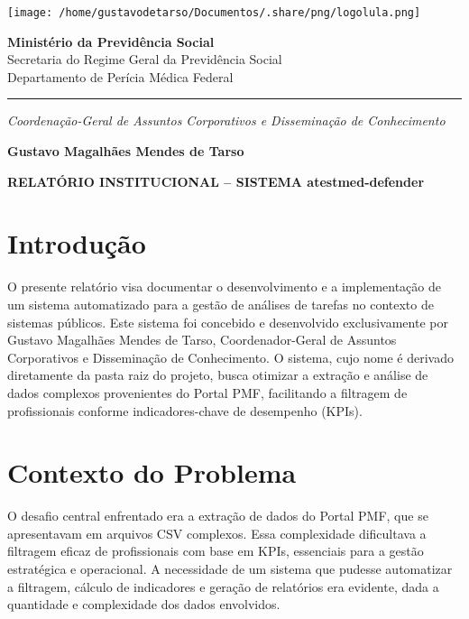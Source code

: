\documentclass[11pt]{article}
\author{Gustavo M. Mendes de Tarso}
\date{\today}
\title{}
\begin{document}
\begin{center}
\texttt{[image: /home/gustavodetarso/Documentos/.share/png/logolula.png]}
\end{center}

\vspace{-1.8cm}
\begin{center}
\textbf{Ministério da Previdência Social}\\
Secretaria do Regime Geral da Previdência Social\\
Departamento de Perícia Médica Federal
\end{center}

\vspace{-0.3cm}
\hrule

\vspace{-0.3cm}
\begin{center}
\textit{Coordenação-Geral de Assuntos Corporativos e Disseminação de Conhecimento}
\end{center}

\vspace{-0.8cm}
\begin{center}
\textbf{Gustavo Magalhães Mendes de Tarso}
\end{center}

\vspace{1.5cm}

\textbf{RELATÓRIO INSTITUCIONAL – SISTEMA atestmed-defender}

\section{Introdução}
\label{sec:org8b382e5}
O presente relatório visa documentar o desenvolvimento e a implementação de um sistema automatizado para a gestão de análises de tarefas no contexto de sistemas públicos. Este sistema foi concebido e desenvolvido exclusivamente por Gustavo Magalhães Mendes de Tarso, Coordenador-Geral de Assuntos Corporativos e Disseminação de Conhecimento. O sistema, cujo nome é derivado diretamente da pasta raiz do projeto, busca otimizar a extração e análise de dados complexos provenientes do Portal PMF, facilitando a filtragem de profissionais conforme indicadores-chave de desempenho (KPIs).

\section{Contexto do Problema}
\label{sec:org557aac6}
O desafio central enfrentado era a extração de dados do Portal PMF, que se apresentavam em arquivos CSV complexos. Essa complexidade dificultava a filtragem eficaz de profissionais com base em KPIs, essenciais para a gestão estratégica e operacional. A necessidade de um sistema que pudesse automatizar a filtragem, cálculo de indicadores e geração de relatórios era evidente, dada a quantidade e complexidade dos dados envolvidos.
\end{document}
